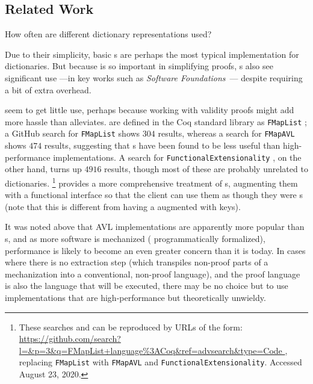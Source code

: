 \subsection{Related Work}
\label{sec:Discussion:Related}

How often are different dictionary representations used?

%
Due to their simplicity, basic {\sal}s are perhaps the most typical implementation for dictionaries.
%
But because \SemInj{} is so important in simplifying proofs, {\fpf}s also see significant use ---in key works such as \emph{Software Foundations}~\cite[Maps]{Pierce:SF1}--- despite requiring a bit of extra overhead.


\Cals{} seem to get little use, perhaps because working with validity proofs might add more hassle than \SemInj{} alleviates.
%
\Cals{} are defined in the Coq standard library as \texttt{FMapList} \citep{FMapList}; a GitHub search for \texttt{FMapList} shows $304$ results,
%
whereas a search for \texttt{FMapAVL} shows $474$ results, suggesting that {\cal}s have been found to be less useful than high-performance implementations.
%
A search for \texttt{FunctionalExtensionality} \citep{FunExt}, on the other hand, turns up $4916$ results, though most of these are probably unrelated to dictionaries.%
\footnote{\hspace{0.01in}%
%
These searches and can be reproduced by URLs of the form:
\url{https://github.com/search?l=\&p=3\&q=FMapList+language\%3ACoq\&ref=advsearch\&type=Code },
replacing \texttt{FMapList} with \texttt{FMapAVL} and \texttt{FunctionalExtensionality}.
%
Accessed August 23, 2020.
%
}
%
\citet{Amorim:fmap} provides a more comprehensive treatment of {\cal}s, augmenting them with a functional interface so that the client can
%
use them as though they were {\fpf}s (note that this is different from having a \fpf{} augmented with keys).


%
It was noted above that AVL implementations are apparently more popular than {\cal}s, and as more software is mechanized (\ie{} programmatically formalized), performance is likely to become an
%
even greater concern than it is today. In cases where there is no extraction step (which transpiles non-proof parts of a mechanization into a conventional, non-proof language), and the proof language is also the language that will be executed,
%
there may be no choice but to use implementations that are high-performance but theoretically unwieldy.

